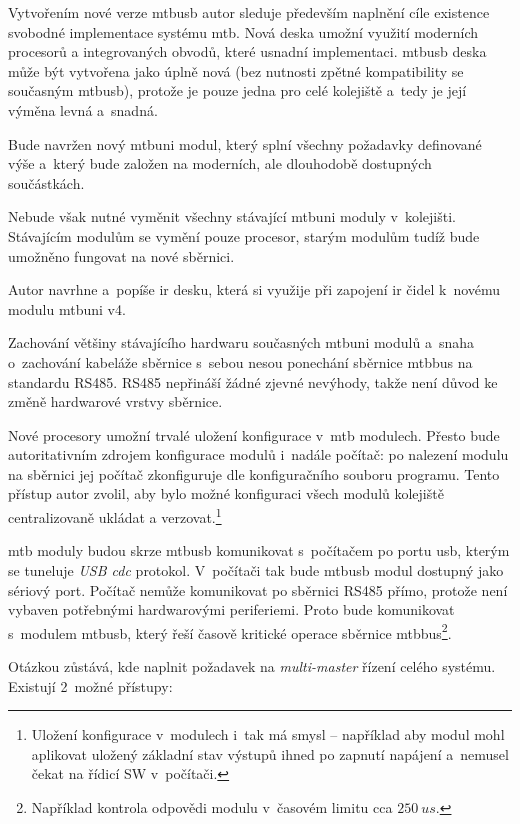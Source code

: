 Vytvořením nové verze \gls{mtbusb} autor sleduje především
naplnění cíle existence svobodné implementace systému \gls{mtb}. Nová deska
umožní využití moderních procesorů a integrovaných obvodů, které usnadní
implementaci. \gls{mtbusb} deska může být vytvořena jako úplně nová (bez nutnosti
zpětné kompatibility se současným \gls{mtbusb}), protože je pouze jedna pro
celé kolejiště a~tedy je její výměna levná a~snadná.

Bude navržen nový \gls{mtbuni} modul, který splní všechny požadavky definované
výše a~který bude založen na moderních, ale dlouhodobě dostupných součástkách.

Nebude však nutné vyměnit všechny stávající \gls{mtbuni} moduly v~kolejišti.
Stávajícím modulům se vymění pouze procesor, starým modulům tudíž bude umožněno
fungovat na nové sběrnici.

Autor navrhne a~popíše \gls{ir} desku, která si využije při zapojení \gls{ir}
čidel k~novému modulu \gls{mtbuni} v4.

Zachování většiny stávajícího hardwaru současných \gls{mtbuni} modulů a~snaha
o~zachování kabeláže sběrnice s~sebou nesou ponechání sběrnice \gls{mtbbus}
na standardu RS485. RS485 nepřináší žádné zjevné nevýhody, takže není důvod
ke změně hardwarové vrstvy sběrnice.

Nové procesory umožní trvalé uložení konfigurace v~\gls{mtb} modulech.
Přesto bude autoritativním zdrojem konfigurace modulů i~nadále počítač: po
nalezení modulu na sběrnici jej počítač zkonfiguruje dle konfiguračního
souboru programu. Tento přístup autor zvolil, aby bylo možné konfiguraci všech
modulů kolejiště centralizovaně ukládat a verzovat.\footnote{Uložení konfigurace
v~modulech i~tak má smysl – například aby modul mohl aplikovat uložený základní
stav výstupů ihned po zapnutí napájení a~nemusel čekat na řídicí SW
v~počítači.}

\gls{mtb} moduly budou skrze \gls{mtbusb} komunikovat s~počítačem po portu
\gls{usb}, kterým se tuneluje \textit{USB \gls{cdc}} protokol. V~počítači tak bude
\gls{mtbusb} modul dostupný jako sériový port. Počítač nemůže komunikovat po
sběrnici RS485 přímo, protože není vybaven potřebnými hardwarovými periferiemi.
Proto bude komunikovat s~modulem \gls{mtbusb}, který řeší časově kritické
operace sběrnice \gls{mtbbus}\footnote{Například kontrola odpovědi modulu
v~časovém limitu cca $250~us$.}.

Otázkou zůstává, kde naplnit požadavek na \textit{multi-master} řízení celého
systému. Existují 2~možné přístupy:

